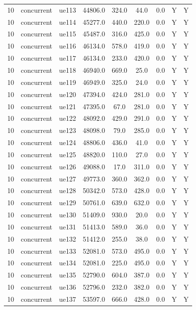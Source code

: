 \begin{table}[ht]
\begin{tabular}{|c|c|c|c|c|c|c|c|c|}
10 & concurrent & ue113 & 44806.0 & 324.0 & 44.0 & 0.0 & Y & Y \\
10 & concurrent & ue114 & 45277.0 & 440.0 & 220.0 & 0.0 & Y & Y \\
10 & concurrent & ue115 & 45487.0 & 316.0 & 425.0 & 0.0 & Y & Y \\
10 & concurrent & ue116 & 46134.0 & 578.0 & 419.0 & 0.0 & Y & Y \\
10 & concurrent & ue117 & 46134.0 & 233.0 & 420.0 & 0.0 & Y & Y \\
10 & concurrent & ue118 & 46940.0 & 669.0 & 25.0 & 0.0 & Y & Y \\
10 & concurrent & ue119 & 46949.0 & 325.0 & 24.0 & 0.0 & Y & Y \\
10 & concurrent & ue120 & 47394.0 & 424.0 & 281.0 & 0.0 & Y & Y \\
10 & concurrent & ue121 & 47395.0 & 67.0 & 281.0 & 0.0 & Y & Y \\
10 & concurrent & ue122 & 48092.0 & 429.0 & 291.0 & 0.0 & Y & Y \\
10 & concurrent & ue123 & 48098.0 & 79.0 & 285.0 & 0.0 & Y & Y \\
10 & concurrent & ue124 & 48806.0 & 436.0 & 41.0 & 0.0 & Y & Y \\
10 & concurrent & ue125 & 48820.0 & 110.0 & 27.0 & 0.0 & Y & Y \\
10 & concurrent & ue126 & 49088.0 & 17.0 & 311.0 & 0.0 & Y & Y \\
10 & concurrent & ue127 & 49773.0 & 360.0 & 362.0 & 0.0 & Y & Y \\
10 & concurrent & ue128 & 50342.0 & 573.0 & 428.0 & 0.0 & Y & Y \\
10 & concurrent & ue129 & 50761.0 & 639.0 & 632.0 & 0.0 & Y & Y \\
10 & concurrent & ue130 & 51409.0 & 930.0 & 20.0 & 0.0 & Y & Y \\
10 & concurrent & ue131 & 51413.0 & 589.0 & 36.0 & 0.0 & Y & Y \\
10 & concurrent & ue132 & 51412.0 & 255.0 & 38.0 & 0.0 & Y & Y \\
10 & concurrent & ue133 & 52081.0 & 573.0 & 495.0 & 0.0 & Y & Y \\
10 & concurrent & ue134 & 52081.0 & 225.0 & 495.0 & 0.0 & Y & Y \\
10 & concurrent & ue135 & 52790.0 & 604.0 & 387.0 & 0.0 & Y & Y \\
10 & concurrent & ue136 & 52796.0 & 232.0 & 382.0 & 0.0 & Y & Y \\
10 & concurrent & ue137 & 53597.0 & 666.0 & 428.0 & 0.0 & Y & Y \\

\end{tabular}
\end{table}
